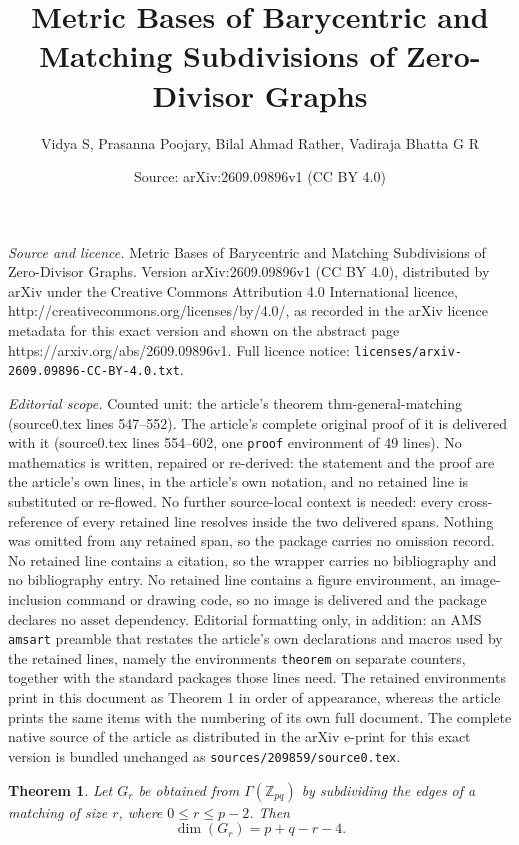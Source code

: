 \documentclass[10pt,a4paper]{amsart}
\title{Metric Bases of Barycentric and Matching Subdivisions of Zero-Divisor Graphs}
\author{Vidya S, Prasanna Poojary, Bilal Ahmad Rather, Vadiraja Bhatta G R}
\date{Source: arXiv:2609.09896v1 (CC BY 4.0)}
\newtheorem{theorem}{Theorem}
\begin{document}
\maketitle

\noindent\emph{Source and licence.} Metric Bases of Barycentric and Matching Subdivisions of Zero-Divisor Graphs. Version arXiv:2609.09896v1 (CC BY 4.0), distributed by arXiv under the Creative Commons Attribution 4.0 International licence, http://creativecommons.org/licenses/by/4.0/, as recorded in the arXiv licence metadata for this exact version and shown on the abstract page https://arxiv.org/abs/2609.09896v1. Full licence notice: \texttt{licenses/arxiv-2609.09896-CC-BY-4.0.txt}.\par\smallskip

\noindent\textit{Editorial scope.} Counted unit: the article's theorem thm-general-matching (source0.tex lines 547--552). The article's complete original proof of it is delivered with it (source0.tex lines 554--602, one \texttt{proof} environment of 49 lines). No mathematics is written, repaired or re-derived: the statement and the proof are the article's own lines, in the article's own notation, and no retained line is substituted or re-flowed.  No further source-local context is needed: every cross-reference of every retained line resolves inside the two delivered spans.  Nothing was omitted from any retained span, so the package carries no omission record.  No retained line contains a citation, so the wrapper carries no bibliography and no bibliography entry.  No retained line contains a figure environment, an image-inclusion command or drawing code, so no image is delivered and the package declares no asset dependency.  Editorial formatting only, in addition: an AMS \texttt{amsart} preamble that restates the article's own declarations and macros used by the retained lines, namely the environments \texttt{theorem} on separate counters, together with the standard packages those lines need.  The retained environments print in this document as Theorem 1 in order of appearance, whereas the article prints the same items with the numbering of its own full document.  The complete native source of the article as distributed in the arXiv e-print for this exact version is bundled unchanged as \texttt{sources/209859/source0.tex}.
\begin{theorem}\label{thm-general-matching}
Let $G_r$ be obtained from $\Gamma(\mathbb Z_{pq})$ by subdividing the edges of a matching of size $r$, where $0\leq r\leq p-2$. Then
$$
\dim(G_r)=p+q-r-4.
$$
\end{theorem}
\end{document}
